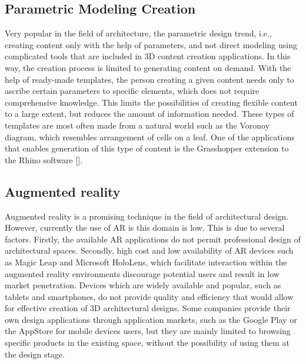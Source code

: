 \documentclass[runningheads]{llncs}
\begin{document}
\subsection{Parametric Modeling Creation}
Very popular in the field of architecture, the parametric design trend, i.e., creating content only with the help of parameters, and not direct modeling using complicated tools that are included in 3D content creation applications. In this way, the creation process is limited to generating content on demand. With the help of ready-made templates, the person creating a given content needs only to ascribe certain parameters to specific elements, which does not require comprehensive knowledge. This limits the possibilities of creating flexible content to a large extent, but reduces the amount of information needed. These types of templates are most often made from a natural world such as the Voronoy diagram, which resembles arrangement of cells on a leaf. One of the applications that enables generation of this type of content is the Grasshopper extension to the Rhino software [].

\subsection{Augmented reality}
Augmented reality is a promising technique in the field of architectural design. However, currently the use of AR is this domain is low. This is due to several factors. Firstly, the available AR applications do not permit professional design of architectural spaces. Secondly, high cost and low availability of AR devices such as Magic Leap and Microsoft HoloLens, which facilitate interaction within the augmented reality environments discourage potential users and result in low market penetration. Devices which are widely available and popular, such as tablets and smartphones, do not provide quality and efficiency that would allow for effective creation of 3D architectural designs. Some companies provide their own design applications through application markets, such as the Google Play or the AppStore for mobile devices users, but they are mainly limited to browsing specific products in the existing space, without the possibility of using them at the design stage.
\end{document}
